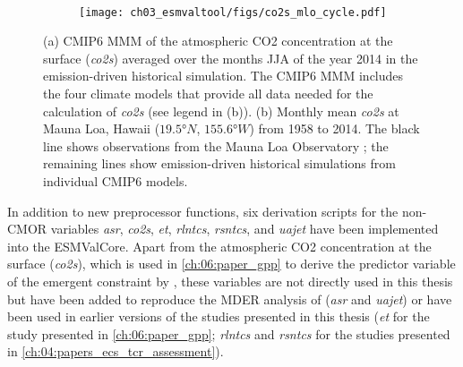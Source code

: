 \begin{figure}[t]
  \centering
  \begin{subfigure}[b]{\SubfigureWidth{}}
    \caption{}
    \label{fig:03:co2s:a}
  \end{subfigure}
  ~
  \begin{subfigure}[b]{\SubfigureWidth{}}
    \texttt{[image: 
      ch03\_esmvaltool/figs/co2s\_mlo\_cycle.pdf]}
    \caption{}
    \label{fig:03:co2s:b}
  \end{subfigure}
  \caption[
    Illustration of the atmospheric \acs{CO2} concentration at the surface
    (\emph{co2}) for \acs{CMIP}6 models.
  ]{
    (a) \acs{CMIP}6 \acf{MMM} of the atmospheric \acs{CO2} concentration at the
    surface (\emph{co2s}) averaged over the months \acf{JJA} of the year 2014
    in the emission-driven historical simulation. The \acs{CMIP}6 \acs{MMM}
    includes the four climate models that provide all data needed for the
    calculation of \emph{co2s} (see legend in (b)). (b) Monthly mean
    \emph{co2s} at Mauna Loa, Hawaii ($19.5 \unit{\degree N}$, $155.6
    \unit{\degree W}$) from 1958 to 2014. The black line shows observations
    from the Mauna Loa Observatory \autocite{Keeling2005}; the remaining lines
    show emission-driven historical simulations from individual \acs{CMIP}6
    models.
  }
  \label{fig:03:co2s}
\end{figure}

In addition to new preprocessor functions, six derivation scripts for the
non-\ac{CMOR} variables \emph{asr}, \emph{co2s}, \emph{et}, \emph{rlntcs},
\emph{rsntcs}, and \emph{uajet} have been implemented into the \ac{ESMValCore}.
Apart from the atmospheric \ac{CO2} concentration at the surface (\emph{co2s}),
which is used in \cref{ch:06:paper_gpp} to derive the predictor variable of the
emergent constraint by \textcite{Wenzel2016}, these variables are not directly
used in this thesis but have been added to reproduce the \ac{MDER} analysis of
\textcite{Wenzel2016a} (\emph{asr} and \emph{uajet}) or have been used in
earlier versions of the studies presented in this thesis (\emph{et} for the
study presented in \cref{ch:06:paper_gpp}; \emph{rlntcs} and \emph{rsntcs} for
the studies presented in \cref{ch:04:papers_ecs_tcr_assessment}).

